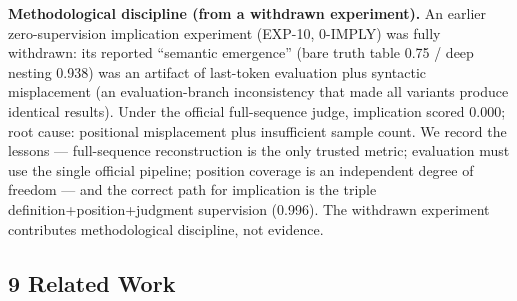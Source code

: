 \documentclass[
]{article}
\begin{document}
\textbf{Methodological discipline (from a withdrawn experiment).} An
earlier zero-supervision implication experiment (EXP-10, 0-IMPLY) was
fully withdrawn: its reported ``semantic emergence'' (bare truth table
0.75 / deep nesting 0.938) was an artifact of last-token evaluation plus
syntactic misplacement (an evaluation-branch inconsistency that made all
variants produce identical results). Under the official full-sequence
judge, implication scored 0.000; root cause: positional misplacement
plus insufficient sample count. We record the lessons --- full-sequence
reconstruction is the only trusted metric; evaluation must use the
single official pipeline; position coverage is an independent degree of
freedom --- and the correct path for implication is the triple
definition+position+judgment supervision (0.996). The withdrawn
experiment contributes methodological discipline, not evidence.

\subsection{9 Related Work}\label{related-work}
\end{document}
